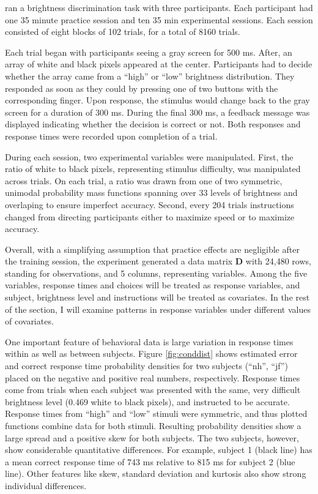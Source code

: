 \documentclass[12pt]{report}
\begin{document}
\citet{RatRou1998} ran a brightness discrimination task with three participants. Each participant had one 35 minute practice session and ten 35 min experimental sessions. Each session consisted of eight blocks of 102 trials, for a total of 8160 trials. 

Each trial began with participants seeing a gray screen for 500 ms. After, an array of white and black pixels appeared at the center. Participants had to decide whether the array came from a ``high'' or ``low'' brightness distribution. They responded as soon as they could by pressing one of two buttons with the corresponding finger. Upon response, the stimulus would change back to the gray screen for a duration of 300 ms. During the final 300 ms, a feedback message was displayed indicating whether the decision is correct or not. Both responses and response times were recorded upon completion of a trial.

During each session, two experimental variables were manipulated. First, the
ratio of white to black pixels, representing stimulus difficulty, was manipulated across
trials. On each trial, a ratio was drawn from one of two symmetric, unimodal probability mass functions spanning over 33 levels of brightness and overlaping to ensure imperfect accuracy. Second,
every 204 trials instructions changed from directing participants either to
maximize speed or to maximize accuracy.

Overall, with a simplifying assumption that practice effects are negligible after the training session, the experiment generated a data matrix $\mathbf{D}$ with 24,480 rows, standing for observations, and 5 columns, representing variables. Among the five variables, response times and choices will be treated as response variables, and subject, brightness level and instructions will be treated as covariates. In the rest of the section, I will examine patterns in response variables under different values of covariates.

One important feature of behavioral data is large variation in response times within as well as between subjects. Figure \ref{fig:conddist} shows estimated error and correct response time probability densities for two subjects (``nh'', ``jf'') placed on the negative and positive real numbers, respectively. Response times come from trials when each subject was presented with the same, very difficult brightness level (0.469 white to black pixels), and instructed to be accurate. Response times from ``high'' and ``low'' stimuli were symmetric, and thus plotted functions combine data for both stimuli. Resulting probability densities show a large spread and a positive skew for both subjects. The two subjects, however, show considerable quantitative differences. For example, subject 1 (black line) has a mean correct response time of 743 ms relative to 815 ms for subject 2 (blue line). Other features like skew, standard deviation and kurtosis also show strong individual differences.
\end{document}
